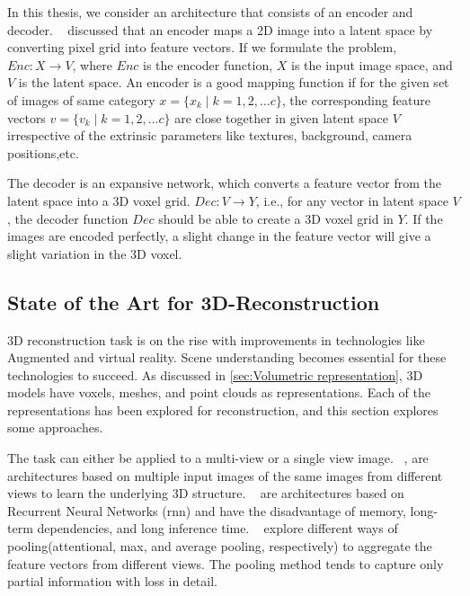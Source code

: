 In this thesis, we consider an architecture that consists of an encoder and decoder.
~\cite{Han2021ImageBased3O} discussed that an encoder maps a 2D image into a latent space by converting pixel grid into feature vectors.
If we formulate the problem, $Enc: X \to V$, where $Enc$ is the encoder function, $X$ is the input image space, and $V$ is the latent space.
An encoder is a good mapping function if for the given set of images of same category $x = \{x_k \mid k = 1,2,\dots c\}$, the corresponding feature vectors $v = \{v_k \mid k = 1,2,\dots c\}$ are close together in given latent space $V$
irrespective of the extrinsic parameters like textures, background, camera positions,etc.

The decoder is an expansive network, which converts a feature vector from the latent space into a 3D voxel grid.
$Dec: V \to Y$, i.e., for any vector in latent space $V$, the decoder function \textbf{$Dec$} should be able to create a 3D voxel grid in $Y$.
If the images are encoded perfectly, a slight change in the feature vector will give a slight variation in the 3D voxel.

\subsection{State of the Art for 3D-Reconstruction}\label{sec:state_of_the_art}

3D reconstruction task is on the rise with improvements in technologies like Augmented and virtual reality.
Scene understanding becomes essential for these technologies to succeed.
As discussed in \autoref{sec:Volumetric representation}, 3D models have voxels, meshes, and point clouds as representations.
Each of the representations has been explored for reconstruction, and this section explores some approaches.

The task can either be applied to a multi-view or a single view image.
~\cite{Kar2017, choy20163d, Yang_2019, Huang2018, Paschalidou2018RayNetLV, Xie_2019, Xie_2020},
are architectures based on multiple input images of the same images from different views to learn the underlying 3D structure.
~\cite{Kar2017, choy20163d} are architectures based on Recurrent Neural Networks (\gls{rnn}) and have the disadvantage of memory,
long-term dependencies, and long inference time.
~\cite{Yang_2019, Huang2018, Paschalidou2018RayNetLV} explore different ways of pooling(attentional, max, and average pooling, respectively)
to aggregate the feature vectors from different views.
The pooling method tends to capture only partial information with loss in detail.

